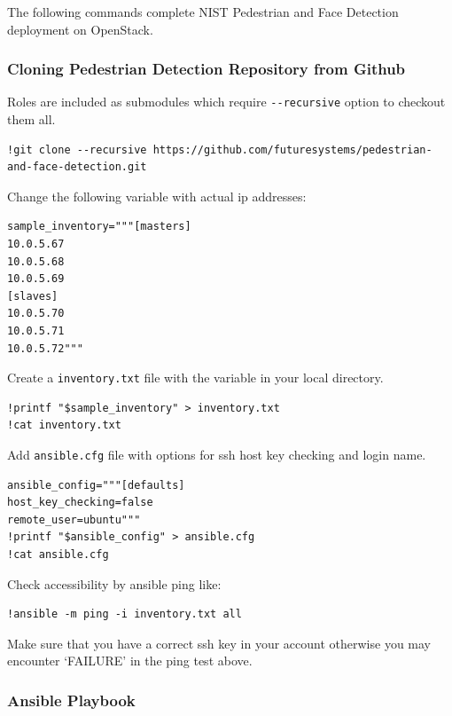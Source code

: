 The following commands complete NIST Pedestrian and Face Detection
deployment on OpenStack.

\subsubsection{Cloning Pedestrian Detection Repository from
Github}\label{cloning-pedestrian-detection-repository-from-github}

Roles are included as submodules which require \texttt{-\/-recursive}
option to checkout them all.

\begin{verbatim}
!git clone --recursive https://github.com/futuresystems/pedestrian-and-face-detection.git
\end{verbatim}

Change the following variable with actual ip addresses:

\begin{verbatim}
sample_inventory="""[masters]
10.0.5.67
10.0.5.68
10.0.5.69
[slaves]
10.0.5.70
10.0.5.71
10.0.5.72"""
\end{verbatim}

Create a \texttt{inventory.txt} file with the variable in your local
directory.

\begin{verbatim}
!printf "$sample_inventory" > inventory.txt
!cat inventory.txt
\end{verbatim}

Add \texttt{ansible.cfg} file with options for ssh host key checking and
login name.

\begin{verbatim}
ansible_config="""[defaults]
host_key_checking=false
remote_user=ubuntu"""
!printf "$ansible_config" > ansible.cfg
!cat ansible.cfg
\end{verbatim}

Check accessibility by ansible ping like:

\begin{verbatim}
!ansible -m ping -i inventory.txt all
\end{verbatim}

Make sure that you have a correct ssh key in your account otherwise you
may encounter `FAILURE' in the ping test above.

\subsubsection{Ansible Playbook}\label{ansible-playbook}

